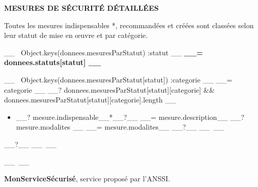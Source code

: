 \documentclass[9pt, a4paper]{article}
\begin{document}
  \textbf{MESURES DE SÉCURITÉ DÉTAILLÉES}

  \textcolor{gris}{Toutes les mesures indispensables *, recommandées et créées sont classées selon
  leur statut de mise en œuvre et par catégorie.}

  \vskip 0.5cm

  __~ Object.keys(donnees.mesuresParStatut) :statut __
    \textbf{__= donnees.statuts[statut] __}

    \begin{tcolorbox}[colback=white, colframe=lisere, boxrule=1px]
      __~ Object.keys(donnees.mesuresParStatut[statut]) :categorie __
        \textcolor{bleu}{__= categorie __}
        __? donnees.mesuresParStatut[statut][categorie] && donnees.mesuresParStatut[statut][categorie].length __
          \begin{itemize}
            __~ donnees.mesuresParStatut[statut][categorie] :mesure __
              \item __? mesure.indispensable__*__?__ __= mesure.description__
                __? mesure.modalites __
                  \textcolor{gris}{__= mesure.modalites__}
                __?__
            __~__
          \end{itemize}
        __?__
      __~__
    \end{tcolorbox}
  __~__

  \vskip 1cm

  \textcolor{bleu}{\textbf{MonServiceSécurisé}}, service proposé par l'ANSSI.
\end{document}
